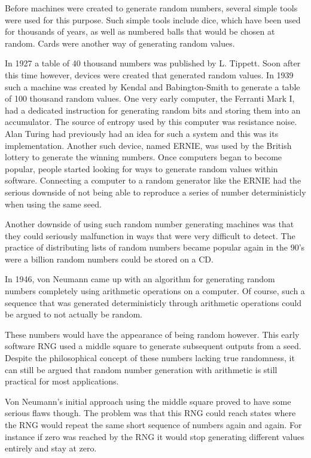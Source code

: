 \documentclass{article}
\begin{document}
    Before machines were created to generate random numbers, several simple tools
    were used for this purpose.
    Such simple tools include dice, which have been used for thousands of years,
    as well as numbered balls that would be chosen at random.
    Cards were another way of generating random values.

    In 1927 a table of 40 thousand numbers was published by L. Tippett.
    Soon after this time however, devices were created that generated random
    values. In 1939 such a machine was created by Kendal and Babington-Smith
    to generate a table of 100 thousand random values.
    One very early computer, the Ferranti Mark I, had a dedicated instruction
    for generating random bits and storing them into an accumulator.
    The source of entropy used by this computer was resistance noise.
    Alan Turing had previously had an idea for such a system and this was
    its implementation.
    Another such device, named ERNIE, was used by the British lottery to
    generate the winning numbers.
    Once computers began to become popular, people started looking for ways
    to generate random values within software. Connecting a computer
    to a random generator like the ERNIE had the serious downside
    of not being able to reproduce a series of number deterministicly
    when using the same seed.

    Another downside of using such random number generating machines
    was that they could seriously malfunction in ways that were very difficult to
    detect.
    The practice of distributing lists of random numbers became popular again
    in the 90's were a billion random numbers could be stored on a CD.

    In 1946, von Neumann came up with an algorithm for generating random
    numbers completely using arithmetic operations on a computer.
    Of course, such a sequence that was generated deterministicly through
    arithmetic operations could be argued to not actually be random.

    These numbers would have the appearance of being random however.
    This early software RNG used a middle square to generate subsequent
    outputs from a seed.
    Despite the philosophical concept of these numbers lacking true randomness,
    it can still be argued that random number generation with
    arithmetic is still practical for most applications.

    Von Neumann's initial approach using the middle square proved to have
    some serious flaws though. The problem was that this RNG could
    reach states where the RNG would repeat the same short sequence of
    numbers again and again. For instance if zero was reached by the RNG
    it would stop generating different values entirely and stay at zero.
\end{document}
